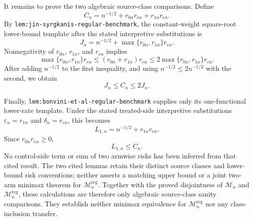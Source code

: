It remains to prove the two algebraic source-class comparisons.  Define
\[
C_n=n^{-1/2}+r_{0n}r_{en}+r_{1n}r_{en}.
\]
By \texttt{lem:jin-syrgkanis-regular-benchmark}, the constant-weight
square-root lower-bound template after the stated interpretive substitutions is
\[
J_n=n^{-1/2}+\max\{r_{0n},r_{1n}\}r_{en}.
\]
Nonnegativity of \(r_{0n}\), \(r_{1n}\), and \(r_{en}\) implies
\[
\max\{r_{0n},r_{1n}\}r_{en}
\le (r_{0n}+r_{1n})r_{en}
\le 2\max\{r_{0n},r_{1n}\}r_{en}.
\]
After adding \(n^{-1/2}\) to the first inequality, and using
\(n^{-1/2}\le2n^{-1/2}\) with the second, we obtain
\[
J_n\le C_n\le2J_n.
\]

Finally, \texttt{lem:bonvini-et-al-regular-benchmark} supplies only its
one-functional lower-rate template.  Under the stated treated-side
interpretive substitutions \(\varepsilon_n=r_{1n}\) and
\(\delta_n=r_{en}\), this becomes
\[
L_{1,n}=n^{-1/2}+r_{1n}r_{en}.
\]
Since \(r_{0n}r_{en}\ge0\),
\[
L_{1,n}\le C_n.
\]
No control-side term or sum of two armwise risks has been inferred from that
cited result.  The two cited lemmas retain their distinct source classes and
lower-bound risk conventions; neither asserts a matching upper bound or a joint
two-arm minimax theorem for \(\mathcal M_n^{\mathrm{reg}}\).  Together with the
proved disjointness of \(\mathcal M_n\) and
\(\mathcal M_n^{\mathrm{reg}}\), these calculations are therefore only
algebraic source-class sanity comparisons.  They establish neither minimax
equivalence for \(\mathcal M_n^{\mathrm{reg}}\) nor any class-inclusion
transfer.
